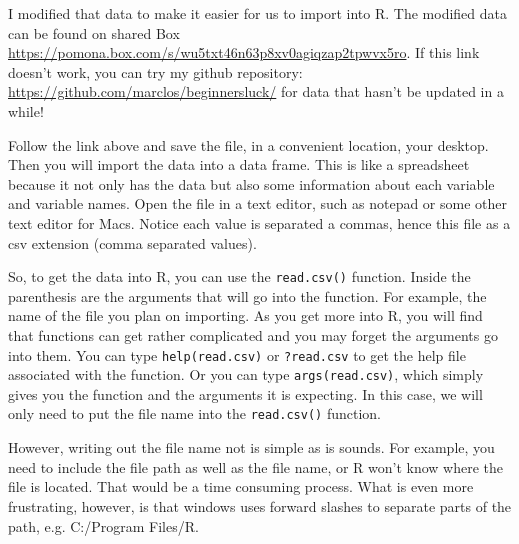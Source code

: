 \documentclass{tufte-handout}\usepackage[]{graphicx}\usepackage[]{xcolor}
\begin{document}
I modified that data to make it easier for us to import into R. The modified data can be found on shared Box \url{https://pomona.box.com/s/wu5txt46n63p8xv0agiqzap2tpwvx5ro}. If this link doesn't work, you can try my github repository: \url{https://github.com/marclos/beginnersluck/} for data that hasn't be updated in a while!



Follow the link above and save the file, in a convenient location, \eg your desktop. Then you will import the data into a data frame. This is like a spreadsheet because it not only has the data but also some information about each variable and variable names. Open the file in a text editor, such as notepad or some other text editor for Macs. Notice each value is separated a commas, hence this file as a csv extension (\ie comma separated values). 

So, to get the data into R, you can use the \texttt{read.csv()} function. Inside the parenthesis are the arguments that will go into the function. For example, the name of the file you plan on importing. As you get more into R, you will find that functions can get rather complicated and you may forget the arguments go into them. You can type \texttt{help(read.csv)} or \texttt{?read.csv} to get the help file associated with the function. Or you can type \texttt{args(read.csv)}, which simply gives you the function and the arguments it is expecting. In this case, we will only need to put the file name into the \texttt{read.csv()} function. 

However, writing out the file name not is simple as is sounds. For example, you need to include the file path as well as the file name, or R won't know where the file is located. That would be a time consuming process. What is even more frustrating, however, is that windows uses forward slashes to separate parts of the path, e.g. C:/Program Files/R.
\end{document}
